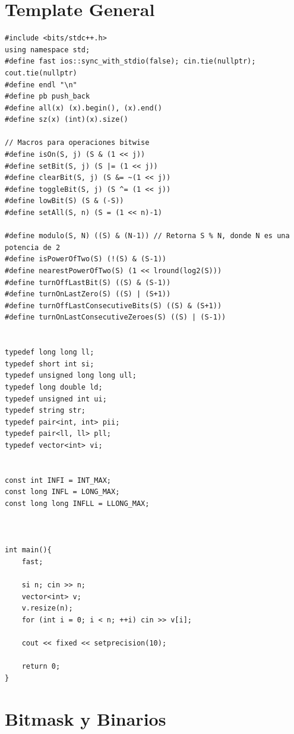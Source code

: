 \documentclass{article}
\begin{document}

\section{Template General}

\begin{lstlisting}[style=cppstyle]
#include <bits/stdc++.h>
using namespace std;
#define fast ios::sync_with_stdio(false); cin.tie(nullptr); cout.tie(nullptr)
#define endl "\n"
#define pb push_back
#define all(x) (x).begin(), (x).end()
#define sz(x) (int)(x).size()

// Macros para operaciones bitwise
#define isOn(S, j) (S & (1 << j))
#define setBit(S, j) (S |= (1 << j))
#define clearBit(S, j) (S &= ~(1 << j))
#define toggleBit(S, j) (S ^= (1 << j))
#define lowBit(S) (S & (-S))
#define setAll(S, n) (S = (1 << n)-1)

#define modulo(S, N) ((S) & (N-1)) // Retorna S % N, donde N es una potencia de 2
#define isPowerOfTwo(S) (!(S) & (S-1))
#define nearestPowerOfTwo(S) (1 << lround(log2(S)))
#define turnOffLastBit(S) ((S) & (S-1))
#define turnOnLastZero(S) ((S) | (S+1))
#define turnOffLastConsecutiveBits(S) ((S) & (S+1))
#define turnOnLastConsecutiveZeroes(S) ((S) | (S-1))


typedef long long ll;
typedef short int si;
typedef unsigned long long ull;
typedef long double ld;
typedef unsigned int ui;
typedef string str;
typedef pair<int, int> pii;
typedef pair<ll, ll> pll;
typedef vector<int> vi;


const int INFI = INT_MAX;
const long INFL = LONG_MAX;
const long long INFLL = LLONG_MAX;



int main(){
    fast;

    si n; cin >> n;
    vector<int> v;
    v.resize(n);
    for (int i = 0; i < n; ++i) cin >> v[i];

    cout << fixed << setprecision(10);

    return 0;
}

\end{lstlisting}


\section{Bitmask y Binarios}
\end{document}
